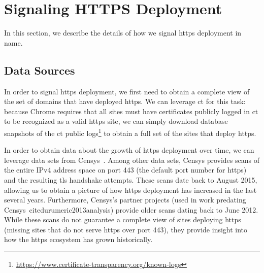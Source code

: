 \section{Signaling HTTPS Deployment}
\label{sec:signaling}

In this section, we describe the details of how we signal \ac{https} deployment
in \ac{name}.

\subsection{Data Sources}

In order to signal \ac{https} deployment, we first need to obtain a complete
view of the set of domains that have deployed \ac{https}. We can leverage
\ac{ct} for this task: because Chrome requires that all sites must have
certificates publicly logged in \ac{ct} to be recognized as a valid \ac{https}
site, we can simply download database snapshots of the \ac{ct} public
logs\footnote{\url{https://www.certificate-transparency.org/known-logs}} to
obtain a full set of the sites that deploy \ac{https}.

In order to obtain data about the growth of \ac{https} deployment over time, we
can leverage data sets from Censys~\cite{durumeric2015search}. Among other data
sets, Censys provides scans of the entire IPv4 address space on port 443 (the
default port number for \ac{https}) and the resulting \ac{tls} handshake
attempts. These scans date back to August 2015, allowing us to obtain a picture
of how \ac{https} deployment has increased in the last several years.
Furthermore, Censys's partner projects (used in work predating
Censys~cite{durumeric2013analysis}) provide older scans dating back to June
2012. While these scans do not guarantee a complete view of sites deploying
\ac{https} (missing sites that do not serve \ac{https} over port 443), they
provide insight into how the \ac{https} ecosystem has grown historically.


